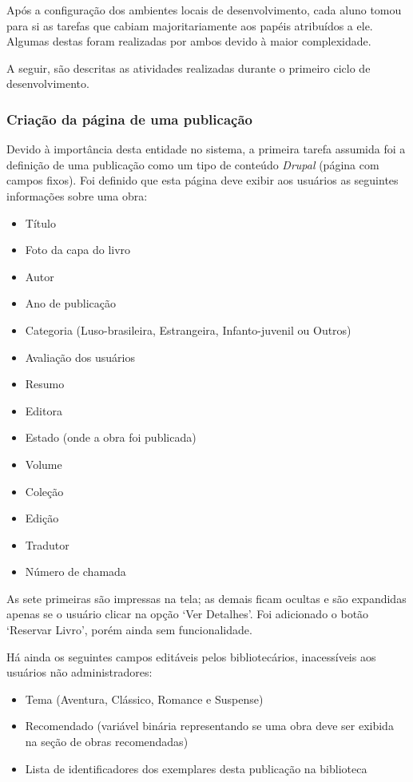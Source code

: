 \documentclass[a4paper]{article}
\begin{document}
Após a configuração dos ambientes locais de desenvolvimento, cada aluno tomou para si as tarefas que cabiam majoritariamente aos papéis atribuídos a ele. Algumas destas foram realizadas por ambos devido à maior complexidade.

A seguir, são descritas as atividades realizadas durante o primeiro ciclo de desenvolvimento.

\subsubsection{Criação da página de uma publicação}
Devido à importância desta entidade no sistema, a primeira tarefa assumida foi a definição de uma publicação como um tipo de conteúdo \textit{Drupal} (página com campos fixos). Foi definido que esta página deve exibir aos usuários as seguintes informações sobre uma obra:
\begin{itemize}
\item Título
\item Foto da capa do livro
\item Autor
\item Ano de publicação
\item Categoria (Luso-brasileira, Estrangeira, Infanto-juvenil ou Outros)
\item Avaliação dos usuários
\item Resumo
\item Editora
\item Estado (onde a obra foi publicada)
\item Volume
\item Coleção
\item Edição
\item Tradutor
\item Número de chamada
\end{itemize}

As sete primeiras são impressas na tela; as demais ficam ocultas e são expandidas apenas se o usuário clicar na opção ‘Ver Detalhes’. Foi adicionado o botão ‘Reservar Livro’, porém ainda sem funcionalidade.

Há ainda os seguintes campos editáveis pelos bibliotecários, inacessíveis aos usuários não administradores:
\begin{itemize}
\item Tema (Aventura, Clássico, Romance e Suspense)
\item Recomendado (variável binária representando se uma obra deve ser exibida na seção de obras recomendadas)
\item Lista de identificadores dos exemplares desta publicação na biblioteca
\end{itemize}
\end{document}
